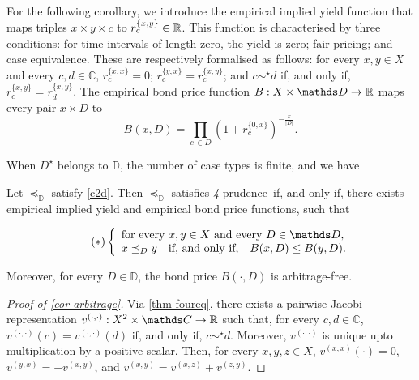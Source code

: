 \documentclass[12pt,a4paper,twoside]{article}
\newcommand{\mbbd}{{\mathds D}}
\newcommand{\mbbc}{{\mathds C}}
\newcommand{\xy}{{(x, y)}}
\newcommand{\yx}{{(y, x)}}
\newcommand{\zy}{{(z,y)}}
\newcommand{\xz}{{(x,z)}}
\newcommand{\dd}{{(\cdot,\cdot)}}
\newcommand{\fourpru}{\textit{4}-\textup{prudence}}
\begin{document}
\begin{example}
For the following corollary, we introduce the empirical implied yield function
that maps triples $x \times y \times c $ to $ r^{\{x,y\}}_{c} \in \mathbb R$.  This
function is characterised by three conditions: for time intervals of length
zero, the yield is zero; fair pricing; and case equivalence.  These are
respectively formalised as follows: for every $x,y\in X$ and every
$c , d\in \mbbc$, $ r^{\{x,x\}}_{c} = 0$; $r^{\{y,x\}}_{c} = r^{\{x,y\}}_{c}$;
and $c \sim^{\star} d$ if, and only if, $r^{\{x,y\}}_{c} = r^{\{x,y\}}_{d}$. The
empirical bond price function $B : X \times \mbbd \rightarrow \R$ maps every
pair $x \times D$ to
\[ B(x,D) = \prod_{c\, \in D}\left( 1 + r^{\{0,x\}}_{c}
  \right)^{-\frac{x}{ \lvert D \rvert}}.
  \]

When $D^{\star}$ belongs to $\mbbd$, the number of case types is finite, and we have
\begin{corollary}\label{cor-arbitrage}
  Let $\preceq_{\mbbd}$ satisfy \ref{c2d}. Then $\preceq_{\mbbd}$ satisfies
  \fourpru\ if, and only if, there exists empirical implied yield and
  empirical bond price functions, such that
  \begin{linenomath*} 
    \begin{equation}\tag{$*$}\label{eq-bond-rep}
 \left\{
  \begin{array}{l}
    \text{for every $ x , y \in X$ and every $ D \in \mbbd $,}\\
      x \preceq_{D} y \quad \text{if, and only if,}\quad B(x,D) \leq B(y,D).
  \end{array}\right.
      \end{equation}
    \end{linenomath*} 
    Moreover, for every $D\in \mbbd$, the bond price
    $B(\cdot,D)$ is arbitrage-free.
\end{corollary}
\begin{proof}[Proof of \cref{cor-arbitrage}]
  Via \cref{thm-foureq}, there exists a pairwise Jacobi representation
  $v^{\dd}: X^{2} \times \mbbc \rightarrow \R$ such that, for every
  $c,d\in \mbbc$, $v^{\dd}(c) = v^{\dd}(d)$ if, and only if, $c \sim^{\star}
  d$. Moreover, $v^{\dd}$ is unique upto multiplication by a positive
  scalar. Then, for every $x, y, z \in X$, $v^{(x,x)}(\cdot) = 0$,
  $v^{\yx} = - v^{\xy}$, and $v^{\xy} = v^{\xz} + v^{\zy}$.


\end{proof}
\end{example}
\end{document}
